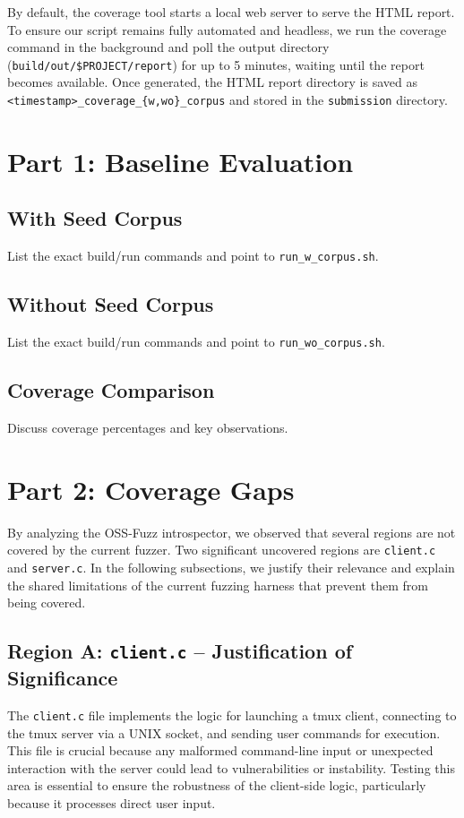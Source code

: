 \documentclass[11pt,a4paper,twocolumn]{article}
\begin{document}
By default, the coverage tool starts a local web server to serve the HTML report. To ensure our script remains fully automated and headless, we run the coverage command in the background and poll the output directory (\texttt{build/out/\$PROJECT/report}) for up to 5 minutes, waiting until the report becomes available. Once generated, the HTML report directory is saved as \texttt{<timestamp>\_coverage\_{\{w,wo\}\_corpus}} and stored in the \texttt{submission} directory.

\section{Part 1: Baseline Evaluation}

\subsection{With Seed Corpus}

List the exact build/run commands and point to \texttt{run\_w\_corpus.sh}.

\subsection{Without Seed Corpus}
List the exact build/run commands and point to \texttt{run\_wo\_corpus.sh}.

\subsection{Coverage Comparison}
Discuss coverage percentages and key observations.

\section{Part 2: Coverage Gaps}
By analyzing the OSS-Fuzz introspector, we observed that several regions are not covered by the current fuzzer. Two significant uncovered regions are \texttt{client.c} and \texttt{server.c}. In the following subsections, we justify their relevance and explain the shared limitations of the current fuzzing harness that prevent them from being covered.

\subsection{Region A: \texttt{client.c} – Justification of Significance}
The \texttt{client.c} file implements the logic for launching a tmux client, connecting to the tmux server via a UNIX socket, and sending user commands for execution. This file is crucial because any malformed command-line input or unexpected interaction with the server could lead to vulnerabilities or instability. Testing this area is essential to ensure the robustness of the client-side logic, particularly because it processes direct user input.
\end{document}
